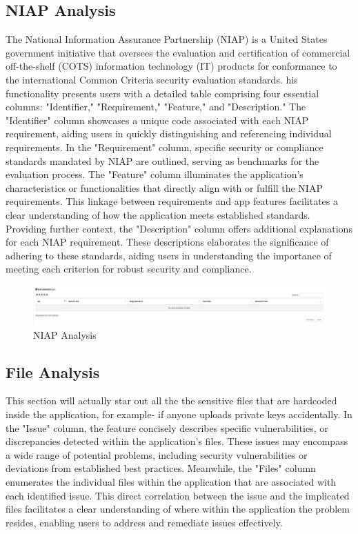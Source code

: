 \documentclass{report}
\begin{document}
\subsection{NIAP Analysis}
The National Information Assurance Partnership (NIAP) is a United States government initiative that oversees the evaluation and certification of commercial off-the-shelf (COTS) information technology (IT) products for conformance to the international Common Criteria security evaluation standards. his functionality presents users with a detailed table comprising four essential columns: "Identifier," "Requirement," "Feature," and "Description."
The "Identifier" column showcases a unique code associated with each NIAP requirement, aiding users in quickly distinguishing and referencing individual requirements.
In the "Requirement" column, specific security or compliance standards mandated by NIAP are outlined, serving as benchmarks for the evaluation process.
The "Feature" column illuminates the application's characteristics or functionalities that directly align with or fulfill the NIAP requirements. This linkage between requirements and app features facilitates a clear understanding of how the application meets established standards.
Providing further context, the "Description" column offers additional explanations for each NIAP requirement. These descriptions elaborates the significance of adhering to these standards, aiding users in understanding the importance of meeting each criterion for robust security and compliance.

\begin{figure}[hbt!]
    \centering
    \includegraphics[width=1\textwidth]{images/niap.jpg}
    \caption{NIAP Analysis}
    \label{fig:example}
\end{figure}
\FloatBarrier

\subsection{File Analysis}
This section will actually star out all the the sensitive files that are hardcoded inside the application, for example- if anyone uploads private keys accidentally.
In the "Issue" column, the feature concisely describes specific vulnerabilities, or discrepancies detected within the application's files. These issues may encompass a wide range of potential problems, including security vulnerabilities or deviations from established best practices.\newline
Meanwhile, the "Files" column enumerates the individual files within the application that are associated with each identified issue. This direct correlation between the issue and the implicated files facilitates a clear understanding of where within the application the problem resides, enabling users to address and remediate issues effectively.
\end{document}
